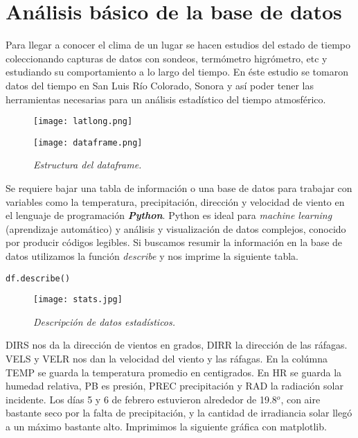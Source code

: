 \documentclass[12pt]{article}
\begin{document}
 


\section{An\'alisis b\'asico de la base de datos}
\noindent 
Para llegar a conocer el clima de un lugar se hacen estudios del estado de tiempo coleccionando capturas de datos con sondeos, term\'ometro higr\'ometro, etc y estudiando su comportamiento a lo largo del tiempo. En \'este estudio se tomaron datos del tiempo en San Luis R\'io Colorado, Sonora y as\'i poder tener las herramientas necesarias para un an\'alisis estad\'istico del tiempo atmosf\'erico.

\begin{figure}[H]
\texttt{[image: latlong.png]}
\centering
\end{figure}

\begin{figure}[H]
\texttt{[image: dataframe.png]}
\centering
\caption{\emph{\scriptsize{Estructura del dataframe.}}}
\end{figure}

Se requiere bajar una tabla de informaci\'on o una base de datos para trabajar con variables como la temperatura, precipitaci\'on, direcci\'on y velocidad de viento en el lenguaje de programaci\'on \textbf{\emph{Python}}. Python es ideal para \emph{machine learning} (aprendizaje autom\'atico) y an\'alisis y visualizaci\'on de datos complejos, conocido por producir c\'odigos legibles.  Si buscamos resumir la informaci\'on en la base de datos utilizamos la funci\'on \emph{describe} y nos imprime la siguiente tabla. 
\begin{verbatim}
df.describe()
\end{verbatim}
\begin{figure}[H]
\texttt{[image: stats.jpg]}
\centering
\caption{\emph{\scriptsize{Descripci\'on de datos estad\'isticos.}}}
\end{figure}

DIRS nos da la direcci\'on de vientos en grados, DIRR la direcci\'on de las r\'afagas. VELS y VELR nos dan la velocidad del viento y las r\'afagas. En la col\'umna TEMP se guarda la temperatura promedio en centigrados. En HR se guarda la humedad relativa, PB es presi\'on, PREC precipitaci\'on y RAD la radiaci\'on solar incidente. Los d\'ias 5 y 6 de febrero estuvieron alrededor de 19.8$^{o}$, con aire bastante seco por la falta de precipitaci\'on, y la cantidad de irradiancia solar lleg\'o a un m\'aximo bastante alto. Imprimimos la siguiente gr\'afica con matplotlib.
\end{document}

